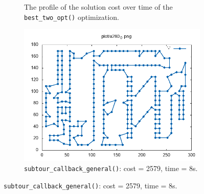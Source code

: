 \begin{figure}[!h]
\begin{subfigure}{.5\columnwidth}
		\caption{The profile of the solution cost over time of the \texttt{best\_two\_opt()} optimization.}
		\label{fig:lb_greedy_best_two_opt_a280}
	\end{subfigure}
	\begin{subfigure}{.5\columnwidth}
		\centering
		\includegraphics[width=0.9\columnwidth]{../res/a280_0.png}
		\caption{\texttt{subtour\_callback\_general()}: cost = 2579, time = 8s.}
		\label{fig:a280_0}
	\end{subfigure}
\end{figure}


